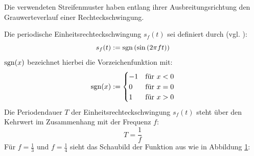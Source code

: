 Die verwendeten Streifenmuster haben entlang ihrer Ausbreitungsrichtung den Grauwerteverlauf einer Rechteckschwingung.

\noindent
Die periodische Einheitsrechteckschwingung $s_f(t)$ sei definiert durch (vgl. \cite{squareWave}):
%
\begin{equation} \label{eq:einheitsrechteckschwingung}
	s_f(t) := \operatorname{sgn} \left( \sin \left(2 \pi f t \right) \right)
\end{equation}
%
$\operatorname{sgn}(x)$ bezeichnet hierbei die Vorzeichenfunktion mit:
%
\begin{equation*}
	\operatorname{sgn}(x) := 
		\begin{cases}
	      -1 & \text{für $x < 0$}\\
	      0 & \text{für $x = 0$}\\
	      1 & \text{für $x > 0$}
	    \end{cases} 
\end{equation*}
%
Die Periodendauer $T$ der Einheitsrechteckschwingung $s_f(t)$ steht über den Kehrwert im Zusammenhang mit der Frequenz $f$:
\begin{equation*}
	T = \dfrac{1}{f}
\end{equation*}
Für $f = \tfrac{1}{3}$ und $f = \tfrac{1}{4}$ sieht das Schaubild der Funktion aus wie in Abbildung \ref{tikz:abbRechteckschwingung}:
{
	\begin{figure}[H]
		\centering
		
		\label{tikz:abbRechteckschwingung}
	\end{figure}
}

